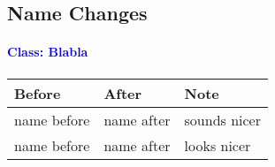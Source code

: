 \subsection{Name Changes}
\paragraph*{\textcolor{Blue}{Class: Blabla}}
\paragraph*{}
\begin{longtable}{llp{10cm}}
	\hline\rowcolor{white}\textbf{Before} & \textbf{After} & \textbf{Note} \\ \hline
	name before & name after & sounds nicer \\
	name before & name after & looks nicer \\
	\hline
\end{longtable}